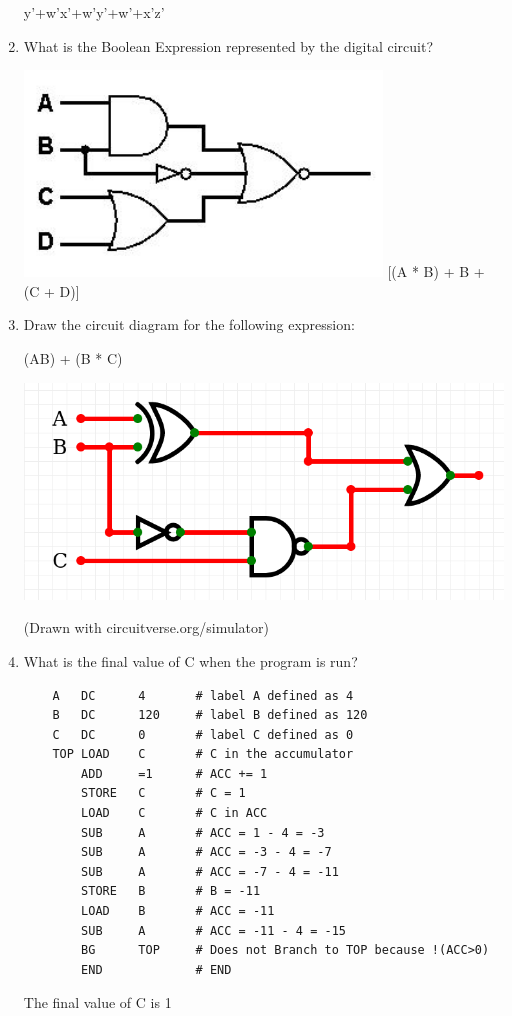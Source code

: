 \documentclass[12pt,a4paper,english]{article}
\newcommand\answer[1]{\color{blue}#1\color{black}}
\begin{document}
\begin{enumerate}
  \answer{y'+w'x'+w'y'+w'+x'z'}
  
\item What is the Boolean Expression represented by the digital circuit?
 
  \includegraphics[scale=.5]{logiccircuit}
  \answer{{\lnot}[(A * B) + {\lnot} B + (C + D)]}

\color{black}\item Draw the circuit diagram for the following expression:
 
  (A\oplus B) + \lnot(\lnot B * C)
 
  \includegraphics[scale=.5]{logicdrawing}
 
  \answer{(Drawn with circuitverse.org/simulator)}

\item What is the final value of C when the program is run?
  \begin{lstlisting}
    A   DC      4       # label A defined as 4
    B   DC      120     # label B defined as 120
    C   DC      0       # label C defined as 0
    TOP LOAD    C       # C in the accumulator
        ADD     =1      # ACC += 1
        STORE   C       # C = 1
        LOAD    C       # C in ACC
        SUB     A       # ACC = 1 - 4 = -3
        SUB     A       # ACC = -3 - 4 = -7
        SUB     A       # ACC = -7 - 4 = -11
        STORE   B       # B = -11
        LOAD    B       # ACC = -11
        SUB     A       # ACC = -11 - 4 = -15
        BG      TOP     # Does not Branch to TOP because !(ACC>0)
        END             # END 
\end{lstlisting}
\answer{The final value of C is 1}

\end{enumerate}
\end{document}
